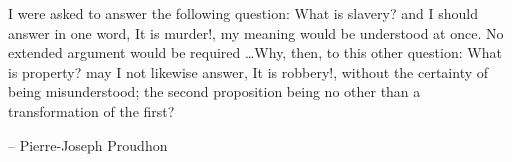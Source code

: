 \documentclass[fleqn,addpoints]{exam}
\begin{document}
\fi

\ifprintanswers
\else
\vspace{10 cm}

\begin{em}
I were asked to answer the following question: What is slavery? and I should answer in one word, It is murder!, my
meaning would be understood at once. No extended argument would be required \ldots Why, then, to this other question:
What is property? may I not likewise answer, It is robbery!, without the certainty of being misunderstood; the second
proposition being no other than a transformation of the first? 
\end{em}

\vspace{0.1 in}
\hspace{0.5 in} -- Pierre-Joseph Proudhon 

\begin{em}
\end{em}

\vspace{0.1 in}
\hspace{0.5 in} 

\fi
\end{document}
